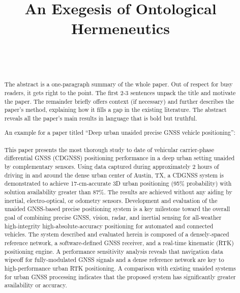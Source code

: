 \documentclass[10pt,journal,twocolumn]{IEEEtran} %
\begin{document}
\title{An Exegesis of Ontological Hermeneutics}

\author{
   \\
   \\
}

\maketitle

\begin{abstract}
  The abstract is a one-paragraph summary of the whole paper.  Out of respect
  for busy readers, it gets right to the point.  The first 2-3 sentences
  unpack the title and motivate the paper.  The remainder briefly offers
  context (if necessary) and further describes the paper's method, explaining
  how it fills a gap in the existing literature.  The abstract reveals all the
  paper's main results in language that is bold but truthful.

An example for a paper titled ``Deep urban unaided precise GNSS vehicle
positioning'': \\ \\ 

This paper presents the most thorough study to date of vehicular carrier-phase
differential GNSS (CDGNSS) positioning performance in a deep urban setting
unaided by complementary sensors.  Using data captured during approximately 2
hours of driving in and around the dense urban center of Austin, TX, a CDGNSS
system is demonstrated to achieve 17-cm-accurate 3D urban positioning (95\%
probability) with solution availability greater than 87\%.  The results are
achieved without any aiding by inertial, electro-optical, or odometry sensors.
Development and evaluation of the unaided GNSS-based precise positioning
system is a key milestone toward the overall goal of combining precise GNSS,
vision, radar, and inertial sensing for all-weather high-integrity
high-absolute-accuracy positioning for automated and connected vehicles.  The
system described and evaluated herein is composed of a densely-spaced
reference network, a software-defined GNSS receiver, and a real-time kinematic
(RTK) positioning engine.  A performance sensitivity analysis reveals that
navigation data wipeoff for fully-modulated GNSS signals and a dense reference
network are key to high-performance urban RTK positioning.  A comparison with
existing unaided systems for urban GNSS processing indicates that the proposed
system has significantly greater availability or accuracy.
\end{abstract}
\end{document}

